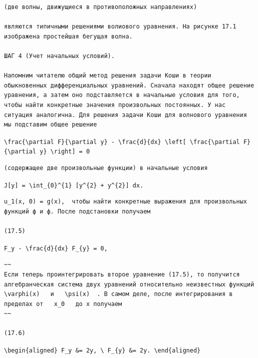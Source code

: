 \documentclass[
  ukrainian,
]{article}
\begin{document}
\begin{verbatim}
(две волны, движущиеся в противоположных направлениях)

являются типичными решениями волиового уравнения. На рисунке 17.1 изображена простейшая бегущая волна.

ШАГ 4 (Учет начальных условий).

Напомним читателю общий метод решения задачи Коши в теории обыкновенных дифференциальных уравнений. Сначала находят общее решение уравнения, а затем оно подставляется в начальные условия для того, чтобы найти конкретные значения произвольных постоянных. У нас ситуация аналогична. Для решения задачи Коши для волнового уравнения мы подставим общее решение
\end{verbatim}

\texttt{\textbackslash{}frac\{\textbackslash{}partial\ F\}\{\textbackslash{}partial\ y\}\ -\ \textbackslash{}frac\{d\}\{dx\}\ \textbackslash{}left{[}\ \textbackslash{}frac\{\textbackslash{}partial\ F\}\{\textbackslash{}partial\ y\textquotesingle{}\}\ \textbackslash{}right{]}\ =\ 0}

\begin{verbatim}
(содержащее две произвольные функции) в начальные условия
\end{verbatim}

\texttt{J{[}y{]}\ =\ \textbackslash{}int\_\{0\}\^{}\{1\}\ {[}y\^{}\{2\}\ +\ y\textquotesingle{}\^{}\{2\}{]}\ dx.}

\begin{verbatim}
u_1(x, 0) = g(x),  чтобы найти конкретные выражения для произвольных функций ф и ф. После подстановки получаем

(17.5)
\end{verbatim}

\texttt{F\_y\ -\ \textbackslash{}frac\{d\}\{dx\}\ F\_\{y\textquotesingle{}\}\ =\ 0,}

\begin{verbatim}
~~
Если теперь проинтегрировать второе уравнение (17.5), то получится алгебранческая система двух уравнений относительно неизвестных функций   \varphi(x)   и   \psi(x)  . В самом деле, после интегрирования в пределах от   x_0   до x получаем
~~

(17.6)
\end{verbatim}

\texttt{\textbackslash{}begin\{aligned\}\ F\_y\ \&=\ 2y,\ \textbackslash{}\ F\_\{y\textquotesingle{}\}\ \&=\ 2y\textquotesingle{}.\ \textbackslash{}end\{aligned\}}
\end{document}
